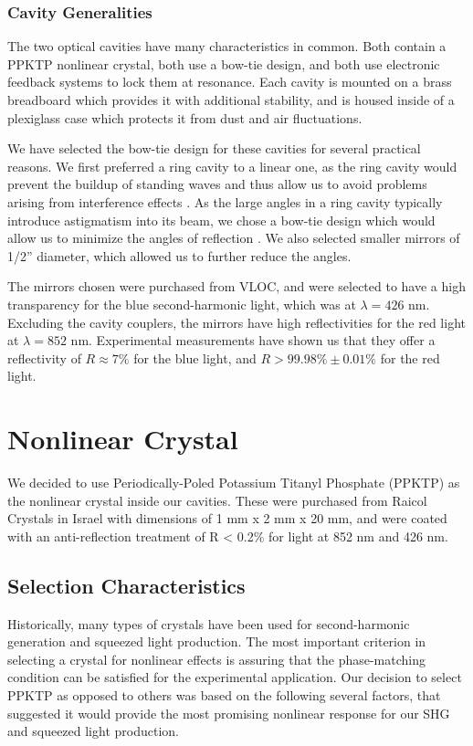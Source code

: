 \subsubsection{Cavity Generalities}
\label{cavity_generalities} 

The two optical cavities have many characteristics in common.  Both contain a PPKTP nonlinear crystal, both use a bow-tie design, and both use electronic feedback systems to lock them at resonance.  Each cavity is mounted on a brass breadboard which provides it with additional stability, and is housed inside of a plexiglass case which protects it from dust and air fluctuations.

We have selected the bow-tie design for these cavities for several practical reasons.  We first preferred a ring cavity to a linear one, as the ring cavity would prevent the buildup of standing waves and thus allow us to avoid problems arising from interference effects \cite{courtillot2003premiere}.  As the large angles in a ring cavity typically introduce astigmatism into its beam, we chose a bow-tie design which would allow us to minimize the angles of reflection \cite{LamPhD}.  We also selected smaller mirrors of 1/2'' diameter, which allowed us to further reduce the angles.

The mirrors chosen were purchased from VLOC, and were selected to have a high transparency for the blue second-harmonic light, which was at $\lambda = 426$ nm.  Excluding the cavity couplers, the mirrors have high reflectivities for the red light at $\lambda = 852$ nm.  Experimental measurements have shown us that they offer a reflectivity of $R \approx 7\%$ for the blue light, and $R>99.98\% \pm 0.01\%$ for the red light.


\section{Nonlinear Crystal} 
\label{nonlinear_crystal} 

We decided to use Periodically-Poled Potassium Titanyl Phosphate (PPKTP) as the nonlinear crystal inside our cavities.  These were purchased from Raicol Crystals in Israel with dimensions of 1 mm x 2 mm x 20 mm, and were coated with an anti-reflection treatment of R < 0.2\% for light at 852 nm and 426 nm.  

\subsection{Selection Characteristics} 
Historically, many types of crystals have been used for second-harmonic
generation and squeezed light production.  The most important criterion in
selecting a crystal for nonlinear effects is assuring that the phase-matching
condition can be satisfied for the experimental application.  Our decision to
select PPKTP as opposed to others was based on the following several factors, that suggested it would provide the most promising nonlinear response for our SHG and squeezed light production.

